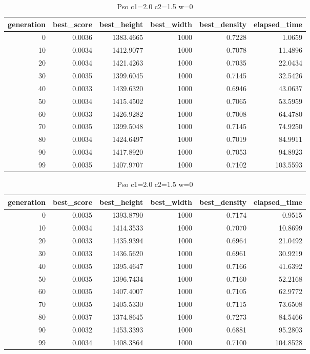 \begin{table}[htbp]
    \centering
    \caption{Pso c1=2.0 c2=1.5 w=0}
    \label{tab:pso_c1_2_0_c2_1_5_w_0}
    \begin{tabular}{rrrrrr}
    \toprule
    generation & best_score & best_height & best_width & best_density & elapsed_time \\
    \midrule
    0 & 0.0036 & 1383.4665 & 1000 & 0.7228 & 1.0659 \\
    10 & 0.0034 & 1412.9077 & 1000 & 0.7078 & 11.4896 \\
    20 & 0.0034 & 1421.4263 & 1000 & 0.7035 & 22.0434 \\
    30 & 0.0035 & 1399.6045 & 1000 & 0.7145 & 32.5426 \\
    40 & 0.0033 & 1439.6320 & 1000 & 0.6946 & 43.0637 \\
    50 & 0.0034 & 1415.4502 & 1000 & 0.7065 & 53.5959 \\
    60 & 0.0033 & 1426.9282 & 1000 & 0.7008 & 64.4780 \\
    70 & 0.0035 & 1399.5048 & 1000 & 0.7145 & 74.9250 \\
    80 & 0.0034 & 1424.6497 & 1000 & 0.7019 & 84.9911 \\
    90 & 0.0034 & 1417.8920 & 1000 & 0.7053 & 94.8923 \\
    99 & 0.0035 & 1407.9707 & 1000 & 0.7102 & 103.5593 \\
    \bottomrule
    \end{tabular}
\end{table}


\begin{table}[htbp]
    \centering
    \caption{Pso c1=2.0 c2=1.5 w=0}
    \label{tab:pso_c1_2_0_c2_1_5_w_0}
    \begin{tabular}{rrrrrr}
    \toprule
    generation & best_score & best_height & best_width & best_density & elapsed_time \\
    \midrule
    0 & 0.0035 & 1393.8790 & 1000 & 0.7174 & 0.9515 \\
    10 & 0.0034 & 1414.3533 & 1000 & 0.7070 & 10.8699 \\
    20 & 0.0033 & 1435.9394 & 1000 & 0.6964 & 21.0492 \\
    30 & 0.0033 & 1436.5620 & 1000 & 0.6961 & 30.9219 \\
    40 & 0.0035 & 1395.4647 & 1000 & 0.7166 & 41.6392 \\
    50 & 0.0035 & 1396.7434 & 1000 & 0.7160 & 52.2168 \\
    60 & 0.0035 & 1407.4007 & 1000 & 0.7105 & 62.9772 \\
    70 & 0.0035 & 1405.5330 & 1000 & 0.7115 & 73.6508 \\
    80 & 0.0037 & 1374.8645 & 1000 & 0.7273 & 84.5466 \\
    90 & 0.0032 & 1453.3393 & 1000 & 0.6881 & 95.2803 \\
    99 & 0.0034 & 1408.3864 & 1000 & 0.7100 & 104.8528 \\
    \bottomrule
    \end{tabular}
\end{table}


